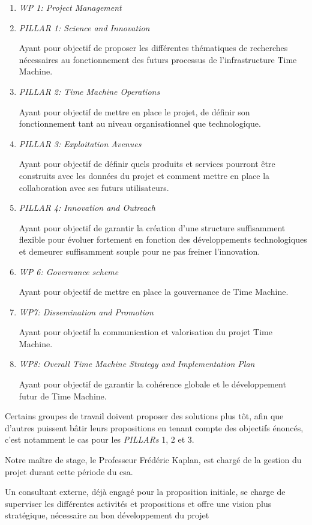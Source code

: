 \begin{enumerate}
\item \textit{WP 1: Project Management}
\item \textit{PILLAR 1: Science and Innovation}

Ayant pour objectif de proposer les différentes thématiques de recherches nécessaires au fonctionnement des futurs processus de l'infrastructure Time Machine.
\item \textit{PILLAR 2: Time Machine Operations}

Ayant pour objectif de mettre en place le projet, de définir son fonctionnement tant au niveau organisationnel que technologique.
\item \textit{PILLAR 3: Exploitation Avenues}

Ayant pour objectif de définir quels produits et services pourront être construits avec les données du projet et comment mettre en place la collaboration avec ses futurs utilisateurs.
\item \textit{PILLAR 4: Innovation and Outreach}

Ayant pour objectif de garantir la création d'une structure suffisamment flexible pour évoluer fortement en fonction des développements technologiques et demeurer suffisamment souple pour ne pas freiner l'innovation.
\item \textit{WP 6: Governance scheme}

Ayant pour objectif de mettre en place la gouvernance de Time Machine.
\item \textit{WP7: Dissemination and Promotion}

Ayant pour objectif la communication et valorisation du projet Time Machine.
\item \textit{WP8: Overall Time Machine Strategy and Implementation Plan}

Ayant pour objectif de garantir la cohérence globale et le développement futur de Time Machine.
\end{enumerate}


Certains groupes de travail doivent proposer des solutions plus tôt, afin que d'autres puissent bâtir leurs propositions en tenant compte des objectifs énoncés, c'est notamment le cas pour les \textit{PILLARs} 1, 2 et 3. 

Notre maître de stage, le Professeur Frédéric Kaplan, est chargé de la gestion du projet durant cette période du \gls{csa}.

Un consultant externe, déjà engagé pour la proposition initiale, se charge de superviser les différentes activités et propositions et offre une vision plus stratégique, nécessaire au bon développement du projet

